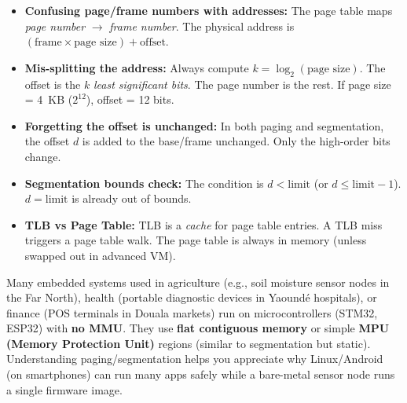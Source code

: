 \documentclass[11pt]{article}
\begin{document}
\begin{attention}
\begin{itemize}
    \item \textbf{Confusing page/frame numbers with addresses:} The page table maps \emph{page number} $\to$ \emph{frame number}. The physical address is $(\text{frame} \times \text{page size}) + \text{offset}$.
    \item \textbf{Mis-splitting the address:} Always compute $k = \log_2(\text{page size})$. The offset is the $k$ \emph{least significant bits}. The page number is the rest. If page size = \SI{4}{KB} ($2^{12}$), offset = 12 bits.
    \item \textbf{Forgetting the offset is unchanged:} In both paging and segmentation, the offset $d$ is added to the base/frame unchanged. Only the high-order bits change.
    \item \textbf{Segmentation bounds check:} The condition is $d < \text{limit}$ (or $d \le \text{limit}-1$). $d = \text{limit}$ is already out of bounds.
    \item \textbf{TLB vs Page Table:} TLB is a \emph{cache} for page table entries. A TLB miss triggers a page table walk. The page table is always in memory (unless swapped out in advanced VM).
\end{itemize}
\end{attention}

\begin{savaistu}
Many embedded systems used in agriculture (e.g., soil moisture sensor nodes in the Far North), health (portable diagnostic devices in Yaoundé hospitals), or finance (POS terminals in Douala markets) run on microcontrollers (STM32, ESP32) with \textbf{no MMU}. They use \textbf{flat contiguous memory} or simple \textbf{MPU (Memory Protection Unit)} regions (similar to segmentation but static). Understanding paging/segmentation helps you appreciate why Linux/Android (on smartphones) can run many apps safely while a bare-metal sensor node runs a single firmware image.
\end{savaistu}
\end{document}
